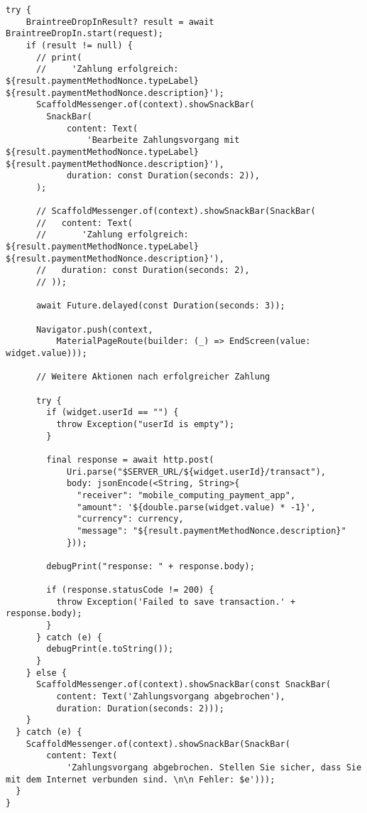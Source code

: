 \begin{lstlisting}[caption={Durchführung des Bezahlvorganges}]
  try {
    BraintreeDropInResult? result = await BraintreeDropIn.start(request);
    if (result != null) {
      // print(
      //     'Zahlung erfolgreich: ${result.paymentMethodNonce.typeLabel} ${result.paymentMethodNonce.description}');
      ScaffoldMessenger.of(context).showSnackBar(
        SnackBar(
            content: Text(
                'Bearbeite Zahlungsvorgang mit ${result.paymentMethodNonce.typeLabel} ${result.paymentMethodNonce.description}'),
            duration: const Duration(seconds: 2)),
      );

      // ScaffoldMessenger.of(context).showSnackBar(SnackBar(
      //   content: Text(
      //       'Zahlung erfolgreich: ${result.paymentMethodNonce.typeLabel} ${result.paymentMethodNonce.description}'),
      //   duration: const Duration(seconds: 2),
      // ));

      await Future.delayed(const Duration(seconds: 3));

      Navigator.push(context,
          MaterialPageRoute(builder: (_) => EndScreen(value: widget.value)));

      // Weitere Aktionen nach erfolgreicher Zahlung

      try {
        if (widget.userId == "") {
          throw Exception("userId is empty");
        }

        final response = await http.post(
            Uri.parse("$SERVER_URL/${widget.userId}/transact"),
            body: jsonEncode(<String, String>{
              "receiver": "mobile_computing_payment_app",
              "amount": '${double.parse(widget.value) * -1}',
              "currency": currency,
              "message": "${result.paymentMethodNonce.description}"
            }));

        debugPrint("response: " + response.body);

        if (response.statusCode != 200) {
          throw Exception('Failed to save transaction.' + response.body);
        }
      } catch (e) {
        debugPrint(e.toString());
      }
    } else {
      ScaffoldMessenger.of(context).showSnackBar(const SnackBar(
          content: Text('Zahlungsvorgang abgebrochen'),
          duration: Duration(seconds: 2)));
    }
  } catch (e) {
    ScaffoldMessenger.of(context).showSnackBar(SnackBar(
        content: Text(
            'Zahlungsvorgang abgebrochen. Stellen Sie sicher, dass Sie mit dem Internet verbunden sind. \n\n Fehler: $e')));
  }
}
\end{lstlisting}

